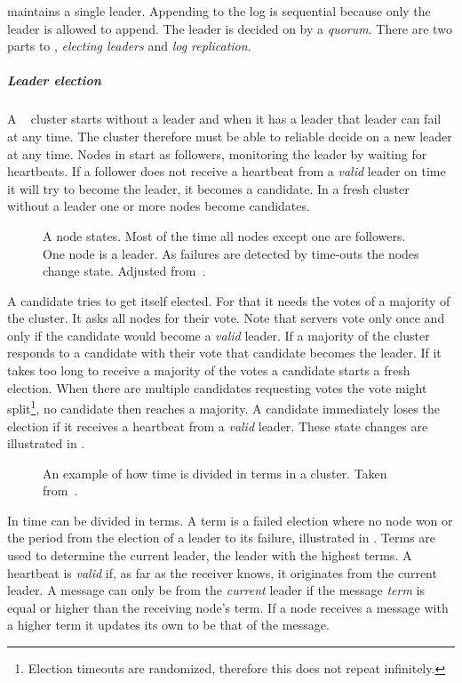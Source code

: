 \raft{} maintains a single leader. Appending to the log is sequential because only the leader is allowed to append. The leader is decided on by a \textit{quorum}. There are two parts to \raft{}, \textit{electing leaders} and \textit{log replication}.

\subparagraph{Leader election} \label{sec:valid}
A \raft{}~\cite{raft} cluster starts without a leader and when it has a leader that leader can fail at any time. The cluster therefore must be able to reliable decide on a new leader at any time. Nodes in \raft{} start as followers, monitoring the leader by waiting for heartbeats. If a follower does not receive a heartbeat from a \emph{valid} leader on time it will try to become the leader, it becomes a candidate. In a fresh cluster without a leader one or more nodes become candidates.

\begin{figure}[htbp]
	\centering
	
	\caption{A \raft{} node states. Most of the time all nodes except one are followers. One node is a leader. As failures are detected by time-outs the nodes change state. Adjusted from~\cite{raft}.}
	\label{fig:raft_states}
\end{figure}
%
A candidate tries to get itself elected. For that it needs the votes of a majority of the cluster. It asks all nodes for their vote. Note that servers vote only once and only if the candidate would become a \emph{valid} leader. If a majority of the cluster responds to a candidate with their vote that candidate becomes the leader. If it takes too long to receive a majority of the votes a candidate starts a fresh election. When there are multiple candidates requesting votes the vote might split\footnote{Election timeouts are randomized, therefore this does not repeat infinitely.}, no candidate then reaches a majority. A candidate immediately loses the election if it receives a heartbeat from a \emph{valid} leader. These state changes are illustrated in .

\begin{figure}[htbp]
	\centering
	
	\caption{An example of how time is divided in terms in a \raft{} cluster. Taken from~\cite{raft}.}
	\label{fig:raft_terms}
\end{figure}

In \raft{} time can be divided in terms. A term is a failed election where no node won or the period from the election of a leader to its failure, illustrated in . Terms are used to determine the current leader, the leader with the highest terms. A heartbeat is \emph{valid} if, as far as the receiver knows, it originates from the current leader. A message can only be from the \textit{current} leader if the message \textit{term} is equal or higher than the receiving node's term. If a node receives a message with a higher term it updates its own to be that of the message.

